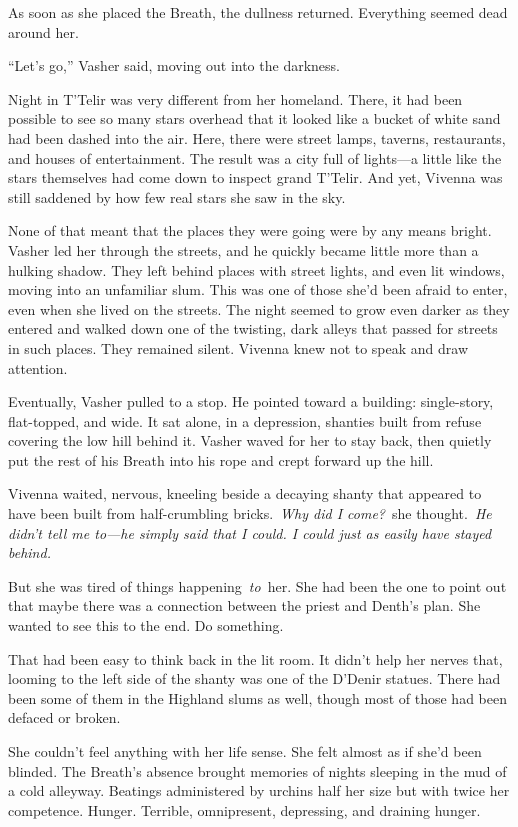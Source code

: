 As soon as she placed the Breath, the dullness returned. Everything seemed dead around her.

“Let’s go,” Vasher said, moving out into the darkness.

Night in T’Telir was very different from her homeland. There, it had been possible to see so many stars overhead that it looked like a bucket of white sand had been dashed into the air. Here, there were street lamps, taverns, restaurants, and houses of entertainment. The result was a city full of lights—a little like the stars themselves had come down to inspect grand T’Telir. And yet, Vivenna was still saddened by how few real stars she saw in the sky.

None of that meant that the places they were going were by any means bright. Vasher led her through the streets, and he quickly became little more than a hulking shadow. They left behind places with street lights, and even lit windows, moving into an unfamiliar slum. This was one of those she’d been afraid to enter, even when she lived on the streets. The night seemed to grow even darker as they entered and walked down one of the twisting, dark alleys that passed for streets in such places. They remained silent. Vivenna knew not to speak and draw attention.

Eventually, Vasher pulled to a stop. He pointed toward a building: single-story, flat-topped, and wide. It sat alone, in a depression, shanties built from refuse covering the low hill behind it. Vasher waved for her to stay back, then quietly put the rest of his Breath into his rope and crept forward up the hill.

Vivenna waited, nervous, kneeling beside a decaying shanty that appeared to have been built from half-crumbling bricks.~\textit{Why did I come?}~she thought.~\textit{He didn’t tell me to—he simply said that I could. I could just as easily have stayed behind.}

But she was tired of things happening~\textit{to}~her. She had been the one to point out that maybe there was a connection between the priest and Denth’s plan. She wanted to see this to the end. Do something.

That had been easy to think back in the lit room. It didn’t help her nerves that, looming to the left side of the shanty was one of the D’Denir statues. There had been some of them in the Highland slums as well, though most of those had been defaced or broken.

She couldn’t feel anything with her life sense. She felt almost as if she’d been blinded. The Breath’s absence brought memories of nights sleeping in the mud of a cold alleyway. Beatings administered by urchins half her size but with twice her competence. Hunger. Terrible, omnipresent, depressing, and draining hunger.

